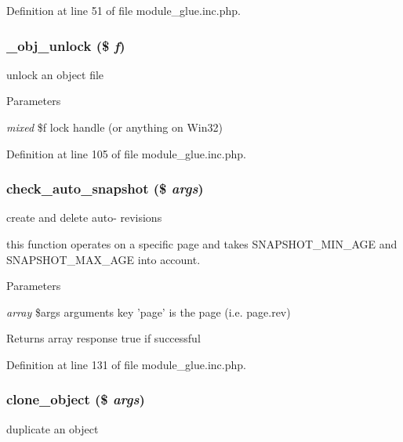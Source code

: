 Definition at line 51 of file module\_\-glue.inc.php.

\hypertarget{module__glue_8inc_8php_a73a91facde5362e20df9657d31c2bb06}{
\subsubsection[{\_\-obj\_\-unlock}]{\setlength{\rightskip}{0pt plus 5cm}\_\-obj\_\-unlock (\$ {\em f})}}
\label{module__glue_8inc_8php_a73a91facde5362e20df9657d31c2bb06}
unlock an object file


\begin{DoxyParams}{Parameters}
\item[{\em mixed}]\$f lock handle (or anything on Win32) \end{DoxyParams}


Definition at line 105 of file module\_\-glue.inc.php.

\hypertarget{module__glue_8inc_8php_aaa1103a091b9dbca790e77d25a452ca5}{
\subsubsection[{check\_\-auto\_\-snapshot}]{\setlength{\rightskip}{0pt plus 5cm}check\_\-auto\_\-snapshot (\$ {\em args})}}
\label{module__glue_8inc_8php_aaa1103a091b9dbca790e77d25a452ca5}
create and delete auto-\/ revisions

this function operates on a specific page and takes SNAPSHOT\_\-MIN\_\-AGE and SNAPSHOT\_\-MAX\_\-AGE into account. 
\begin{DoxyParams}{Parameters}
\item[{\em array}]\$args arguments key 'page' is the page (i.e. page.rev) \end{DoxyParams}
\begin{DoxyReturn}{Returns}
array response true if successful 
\end{DoxyReturn}


Definition at line 131 of file module\_\-glue.inc.php.

\hypertarget{module__glue_8inc_8php_a9c7f39d87787ce288ce3d8a3e389ba95}{
\subsubsection[{clone\_\-object}]{\setlength{\rightskip}{0pt plus 5cm}clone\_\-object (\$ {\em args})}}
\label{module__glue_8inc_8php_a9c7f39d87787ce288ce3d8a3e389ba95}
duplicate an object


